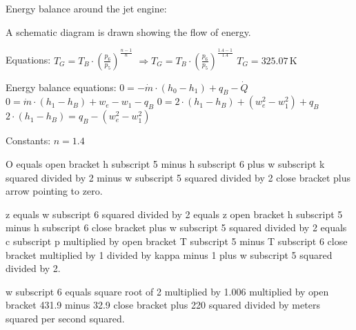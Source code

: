 Energy balance around the jet engine:  

A schematic diagram is drawn showing the flow of energy.  

Equations:  
\( T_G = T_B \cdot \left( \frac{p_6}{p_5} \right)^{\frac{n-1}{n}} \)  
\( \Rightarrow T_G = T_B \cdot \left( \frac{p_6}{p_5} \right)^{\frac{1.4-1}{1.4}} \)  
\( T_G = 325.07 \, \text{K} \)  

Energy balance equations:  
\( 0 = -\dot{m} \cdot (h_0 - h_1) + q_B - \dot{Q} \)  
\( 0 = \dot{m} \cdot (h_1 - h_B) + w_e - w_1 - q_B \)  
\( 0 = 2 \cdot (h_1 - h_B) + (w_e^2 - w_1^2) + q_B \)  
\( 2 \cdot (h_1 - h_B) = q_B - (w_e^2 - w_1^2) \)  

Constants:  
\( n = 1.4 \)

O equals open bracket h subscript 5 minus h subscript 6 plus w subscript k squared divided by 2 minus w subscript 5 squared divided by 2 close bracket plus arrow pointing to zero.

z equals w subscript 6 squared divided by 2 equals z open bracket h subscript 5 minus h subscript 6 close bracket plus w subscript 5 squared divided by 2 equals c subscript p multiplied by open bracket T subscript 5 minus T subscript 6 close bracket multiplied by 1 divided by kappa minus 1 plus w subscript 5 squared divided by 2.

w subscript 6 equals square root of 2 multiplied by 1.006 multiplied by open bracket 431.9 minus 32.9 close bracket plus 220 squared divided by meters squared per second squared.